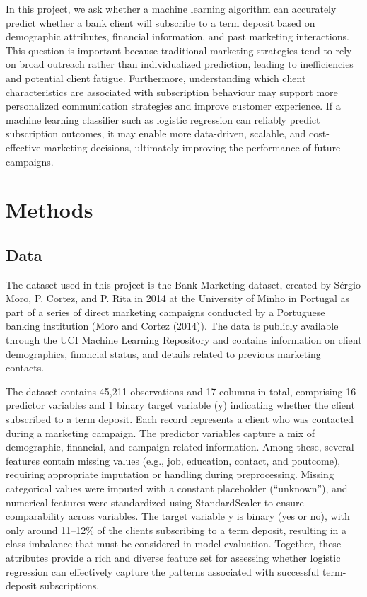 \documentclass[
  letterpaper,
  DIV=11,
  numbers=noendperiod]{scrartcl}
\begin{document}
In this project, we ask whether a machine learning algorithm can
accurately predict whether a bank client will subscribe to a term
deposit based on demographic attributes, financial information, and past
marketing interactions. This question is important because traditional
marketing strategies tend to rely on broad outreach rather than
individualized prediction, leading to inefficiencies and potential
client fatigue. Furthermore, understanding which client characteristics
are associated with subscription behaviour may support more personalized
communication strategies and improve customer experience. If a machine
learning classifier such as logistic regression can reliably predict
subscription outcomes, it may enable more data-driven, scalable, and
cost-effective marketing decisions, ultimately improving the performance
of future campaigns.

\section{Methods}\label{methods}

\subsection{Data}\label{data}

The dataset used in this project is the Bank Marketing dataset, created
by Sérgio Moro, P. Cortez, and P. Rita in 2014 at the University of
Minho in Portugal as part of a series of direct marketing campaigns
conducted by a Portuguese banking institution (Moro and Cortez (2014)).
The data is publicly available through the UCI Machine Learning
Repository and contains information on client demographics, financial
status, and details related to previous marketing contacts.

The dataset contains 45,211 observations and 17 columns in total,
comprising 16 predictor variables and 1 binary target variable (y)
indicating whether the client subscribed to a term deposit. Each record
represents a client who was contacted during a marketing campaign. The
predictor variables capture a mix of demographic, financial, and
campaign-related information. Among these, several features contain
missing values (e.g., job, education, contact, and poutcome), requiring
appropriate imputation or handling during preprocessing. Missing
categorical values were imputed with a constant placeholder
(``unknown''), and numerical features were standardized using
StandardScaler to ensure comparability across variables. The target
variable y is binary (yes or no), with only around 11--12\% of the
clients subscribing to a term deposit, resulting in a class imbalance
that must be considered in model evaluation. Together, these attributes
provide a rich and diverse feature set for assessing whether logistic
regression can effectively capture the patterns associated with
successful term-deposit subscriptions.
\end{document}
